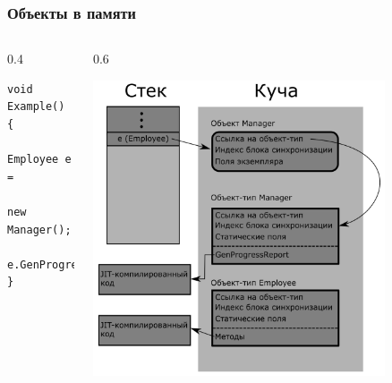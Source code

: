 \documentclass[xetex,mathserif,serif]{beamer}
\begin{document}
\begin{frame}[fragile]
	\frametitle{Объекты в памяти}
	\begin{columns}
		\begin{column}{0.4\textwidth}
			\begin{verbatim}
void Example() 
{
    Employee e = 
        new Manager();
    e.GenProgressReport();
}
			\end{verbatim}
		\end{column}
		\begin{column}{0.6\textwidth}
			\begin{center}
				\includegraphics[width=0.8\textwidth]{objectInMemory.png}
			\end{center}
		\end{column}
	\end{columns}
\end{frame}
\end{document}
